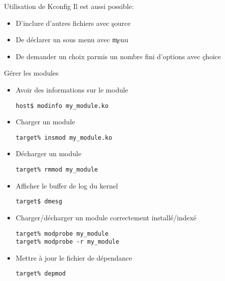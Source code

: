 \begin{frame}[fragile=singleslide]{Utilisation de Kconfig}
  Il est aussi possible:
  \begin{itemize}
  \item D'inclure d'autres fichiers avec \c{source}
  \item De déclarer un sous menu avec \c{menu}
  \item  De demander  un choix  parmis un  nombre fini  d'options avec
    \c{choice}
  \end{itemize}
\end{frame}

\begin{frame}[fragile=singleslide]{Gérer les modules}
  \begin{itemize}
  \item Avoir des informations sur le module
    \begin{lstlisting}
host$ modinfo my_module.ko
    \end{lstlisting} %
  \item Charger un module
    \begin{lstlisting}
target% insmod my_module.ko
    \end{lstlisting} %
  \item Décharger un module
    \begin{lstlisting}
target% rmmod my_module
    \end{lstlisting}%
  \item Afficher le buffer de log du kernel
    \begin{lstlisting}
target$ dmesg
    \end{lstlisting} %
  \item Charger/décharger un module correctement installé/indexé
    \begin{lstlisting}
target% modprobe my_module
target% modprobe -r my_module
    \end{lstlisting} %
  \item Mettre à jour le fichier de dépendance
    \begin{lstlisting}
target% depmod
    \end{lstlisting} %
  \end{itemize}
\end{frame}

